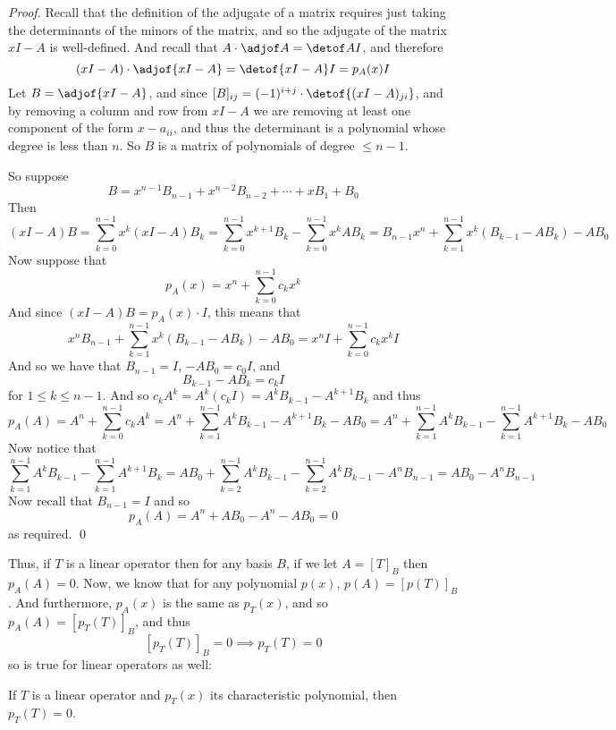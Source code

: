 \begin{proof}

    Recall that the definition of the adjugate of a matrix requires just taking the determinants of the minors of the matrix, and so the adjugate of the matrix $xI-A$ is well-defined.
    And recall that $A\cdot\adjof A=\detof AI$, and therefore
    \[ (xI-A)\cdot\adjof{xI-A} = \detof{xI-A}I = p_A(x)I \]
    Let $B=\adjof{xI-A}$, and since $[B]_{ij}=(-1)^{i+j}\cdot\detof{(xI-A)_{ji}}$, and by removing a column and row from $xI-A$ we are removing at least one component of the form $x-a_{ii}$, and thus the
    determinant is a polynomial whose degree is less than $n$.
    So $B$ is a matrix of polynomials of degree $\leq n-1$.

    So suppose
    \[ B = x^{n-1}B_{n-1} + x^{n-2}B_{n-2} + \cdots + xB_1 + B_0 \]
    Then
    \[ (xI-A)B = \sum_{k=0}^{n-1}x^k(xI-A)B_k = \sum_{k=0}^{n-1}x^{k+1}B_k - \sum_{k=0}^{n-1}x^kAB_k = B_{n-1}x^n + \sum_{k=1}^{n-1}x^k(B_{k-1}-AB_k) - AB_0 \]
    Now suppose that
    \[ p_A(x) = x^n + \sum_{k=0}^{n-1}c_kx^k \]
    And since $(xI-A)B=p_A(x)\cdot I$, this means that
    \[ x^nB_{n-1} + \sum_{k=1}^{n-1}x^k(B_{k-1}-AB_k) - AB_0 = x^nI + \sum_{k=0}^{n-1}c_kx^kI \]
    And so we have that $B_{n-1}=I$, $-AB_0=c_0I$, and
    \[ B_{k-1}-AB_k = c_kI \]
    for $1\leq k\leq n-1$.
    And so $c_kA^k=A^k(c_kI)=A^kB_{k-1}-A^{k+1}B_k$ and thus
    \[ p_A(A) = A^n + \sum_{k=0}^{n-1} c_kA^k = A^n + \sum_{k=1}^{n-1}A^kB_{k-1}-A^{k+1}B_k - AB_0 = A^n + \sum_{k=1}^{n-1} A^kB_{k-1} - \sum_{k=1}^{n-1} A^{k+1}B_k - AB_0 \]
    Now notice that
    \[ \sum_{k=1}^{n-1} A^kB_{k-1} - \sum_{k=1}^{n-1} A^{k+1}B_k = AB_0 + \sum_{k=2}^{n-1} A^kB_{k-1} - \sum_{k=2}^{n-1} A^kB_{k-1} - A^nB_{n-1} = AB_0 - A^nB_{n-1} \]
    Now recall that $B_{n-1}=I$ and so
    \[ p_A(A) = A^n + AB_0 - A^n - AB_0 = 0 \]
    as required.
    \qed

\end{proof}

Thus, if $T$ is a linear operator then for any basis $B$, if we let $A=[T]_B$ then $p_A(A)=0$.
Now, we know that for any polynomial $p(x)$, $p(A)=[p(T)]_B$.
And furthermore, $p_A(x)$ is the same as $p_T(x)$, and so $p_A(A)=[p_T(T)]_B$, and thus
\[ [p_T(T)]_B = 0 \implies p_T(T) = 0 \]
so  is true for linear operators as well:

\begin{coro*}

    If $T$ is a linear operator and $p_T(x)$ its characteristic polynomial, then $p_T(T)=0$.

\end{coro*}

